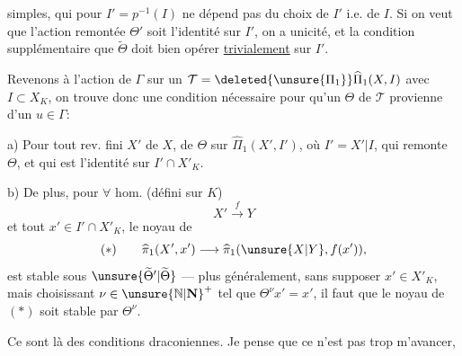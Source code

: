  simples, qui pour $I'=p^{-1}(I)$ ne dépend pas du choix de $I'$ i.e. de $I$. Si on veut que l'action remontée $\Theta'$ soit l'identité sur $I'$, on a unicité, et la condition supplémentaire que $\widetilde{\Theta}$ doit bien opérer \uline{trivialement} sur $I'$.

Revenons à l'action de $\Gamma$  sur un $\mathcal{T}=\deleted{\unsure{\Pi_1}}\widehat{\Pi}_1(X,I)$ avec $I\subset X_K$, on trouve donc une condition nécessaire pour qu'un  $\Theta$ de $\mathcal{T}$  provienne d'un $u\in\Gamma$:

a) Pour tout rev.  fini $X'$ de $X$,    de $\Theta$ sur $\widehat{\Pi}_1(X',I')$, où $I'=X'|I$, qui remonte $\Theta$, et qui est l'identité sur $I'\cap X'_K$.

b) De plus, pour $\forall$ hom. (défini sur $K$)
\[
X'\xrightarrow{f}Y
\]
et tout $x'\in I'\cap X'_K$, le noyau de
\[
(*)\qquad\widehat{\pi}_1(X',x')\longrightarrow\widehat{\pi}_1(\unsure{X|Y},f(x')),
\]
est stable sous $\unsure{\widetilde{\Theta}^{\prime}|\widetilde{\Theta}}$  --- plus généralement, sans supposer $x'\in X'_K$, mais choisissant $\nu\in\unsure{\mathbb{N}|\mathbf{N}}^{+}$ tel que $\Theta^\nu x'=x'$, il faut que \deleted{$\unsure{\Theta}$} le noyau de $(*)$ soit stable par $\Theta^\nu$.

Ce sont là des conditions draconiennes. Je pense que ce n'est pas trop m'avancer,
